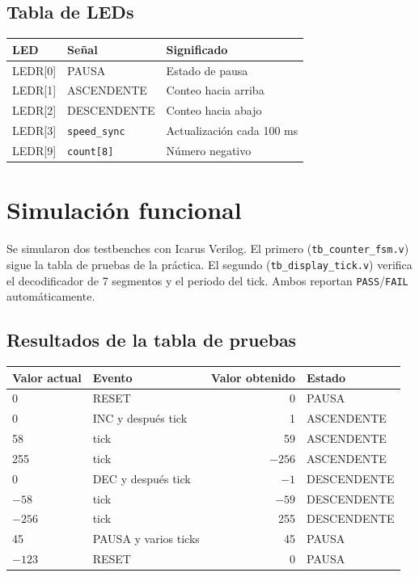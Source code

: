 \documentclass[11pt,a4paper]{article}
\begin{document}
\subsection{Tabla de LEDs}
\begin{center}
\begin{tabular}{@{}llp{7.5cm}@{}}
\toprule
LED & Se\~nal & Significado\\
\midrule
LEDR[0] & PAUSA & Estado de pausa\\
LEDR[1] & ASCENDENTE & Conteo hacia arriba\\
LEDR[2] & DESCENDENTE & Conteo hacia abajo\\
LEDR[3] & \texttt{speed\_sync} & Actualizaci\'on cada 100 ms\\
LEDR[9] & \texttt{count[8]} & N\'umero negativo\\
\bottomrule
\end{tabular}
\end{center}

\section{Simulaci\'on funcional}
Se simularon dos testbenches con Icarus Verilog. El primero (\texttt{tb\_counter\_fsm.v}) sigue la tabla de pruebas de la pr\'actica. El segundo (\texttt{tb\_display\_tick.v}) verifica el decodificador de 7 segmentos y el periodo del tick. Ambos reportan \texttt{PASS}/\texttt{FAIL} autom\'aticamente.

\subsection{Resultados de la tabla de pruebas}
\begin{center}
\begin{tabular}{@{}llrl@{}}
\toprule
Valor actual & Evento & Valor obtenido & Estado\\
\midrule
0 & RESET & 0 & PAUSA\\
0 & INC y despu\'es tick & 1 & ASCENDENTE\\
58 & tick & 59 & ASCENDENTE\\
255 & tick & $-256$ & ASCENDENTE\\
0 & DEC y despu\'es tick & $-1$ & DESCENDENTE\\
$-58$ & tick & $-59$ & DESCENDENTE\\
$-256$ & tick & 255 & DESCENDENTE\\
45 & PAUSA y varios ticks & 45 & PAUSA\\
$-123$ & RESET & 0 & PAUSA\\
\bottomrule
\end{tabular}
\end{center}
\end{document}
